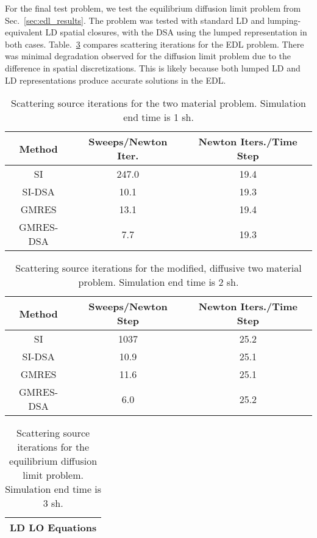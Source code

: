 {For the final test problem, we test the equilibrium diffusion limit problem from
Sec.~\ref{sec:edl_results}.  The problem was tested with standard LD and
lumping-equivalent LD spatial closures, with the DSA using the lumped representation in
both cases.  Table.~\ref{tab:edl_iters} compares scattering iterations for the EDL
problem.  There was minimal
degradation observed for the diffusion limit problem due to the difference in spatial
discretizations.  This is likely because both lumped LD and
LD representations produce accurate solutions in the EDL. 
\begin{table}[p]
    \centering
    \caption{\label{tab:twomat_dsa_iters} Scattering source iterations for the two
material problem.  Simulation end time is 1 sh.}
    \begin{tabular}{|ccc|} \hline
        Method & Sweeps/Newton Iter. & Newton Iters./Time Step \\ \hline
        SI     & 247.0 & 19.4                \\
        SI-DSA & 10.1   & 19.3      \\
        GMRES  & 13.1    &  19.4     \\
        GMRES-DSA & 7.7  &  19.3  \\ \hline
    \end{tabular}
\end{table}
\begin{table}[p]
    \centering
    \caption{\label{tab:twomat_hard_dsa_iters} Scattering source iterations for the
    modified, diffusive two material problem. Simulation end time is 2 sh.}
    \begin{tabular}{|ccc|} \hline
        Method & Sweeps/Newton Step & Newton Iters./Time Step \\ \hline
        SI        & 1037   &  25.2    \\
        SI-DSA    & 10.9   &  25.1   \\
        GMRES     & 11.6   &  25.1   \\
        GMRES-DSA & 6.0    &  25.2   \\ \hline
    \end{tabular}
\end{table}
\begin{table}[p]
    \centering
    \caption{\label{tab:edl_iters} Scattering source iterations for the equilibrium
    diffusion limit problem.  Simulation end time is 3 sh.}
    \begin{tabular}{|ccc|} \hline
        \multicolumn{3}{|c|}{LD LO Equations} \\ \hline

\end{tabular}
\end{table}}
